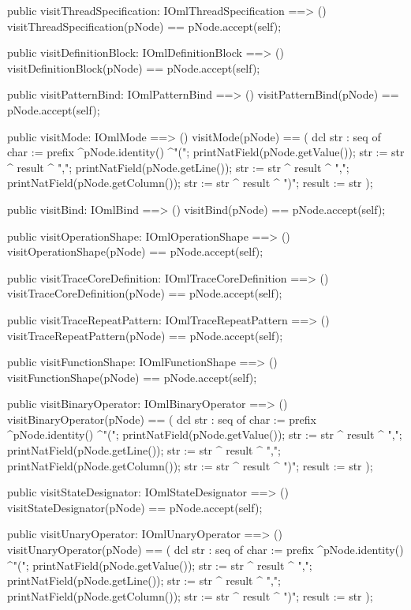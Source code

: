 \begin{vdm_al}
  public visitThreadSpecification: IOmlThreadSpecification ==> ()
  visitThreadSpecification(pNode) == pNode.accept(self);

  public visitDefinitionBlock: IOmlDefinitionBlock ==> ()
  visitDefinitionBlock(pNode) == pNode.accept(self);

  public visitPatternBind: IOmlPatternBind ==> ()
  visitPatternBind(pNode) == pNode.accept(self);

  public visitMode: IOmlMode ==> ()
  visitMode(pNode) == 
    ( dcl str : seq of char := prefix ^pNode.identity() ^"(";
      printNatField(pNode.getValue());
      str := str ^ result ^ ",";
      printNatField(pNode.getLine());
      str := str ^ result ^ ",";
      printNatField(pNode.getColumn());
      str := str ^ result ^ ")";
      result := str );

  public visitBind: IOmlBind ==> ()
  visitBind(pNode) == pNode.accept(self);

  public visitOperationShape: IOmlOperationShape ==> ()
  visitOperationShape(pNode) == pNode.accept(self);

  public visitTraceCoreDefinition: IOmlTraceCoreDefinition ==> ()
  visitTraceCoreDefinition(pNode) == pNode.accept(self);

  public visitTraceRepeatPattern: IOmlTraceRepeatPattern ==> ()
  visitTraceRepeatPattern(pNode) == pNode.accept(self);

  public visitFunctionShape: IOmlFunctionShape ==> ()
  visitFunctionShape(pNode) == pNode.accept(self);

  public visitBinaryOperator: IOmlBinaryOperator ==> ()
  visitBinaryOperator(pNode) == 
    ( dcl str : seq of char := prefix ^pNode.identity() ^"(";
      printNatField(pNode.getValue());
      str := str ^ result ^ ",";
      printNatField(pNode.getLine());
      str := str ^ result ^ ",";
      printNatField(pNode.getColumn());
      str := str ^ result ^ ")";
      result := str );

  public visitStateDesignator: IOmlStateDesignator ==> ()
  visitStateDesignator(pNode) == pNode.accept(self);

  public visitUnaryOperator: IOmlUnaryOperator ==> ()
  visitUnaryOperator(pNode) == 
    ( dcl str : seq of char := prefix ^pNode.identity() ^"(";
      printNatField(pNode.getValue());
      str := str ^ result ^ ",";
      printNatField(pNode.getLine());
      str := str ^ result ^ ",";
      printNatField(pNode.getColumn());
      str := str ^ result ^ ")";
      result := str );


\end{vdm_al}
